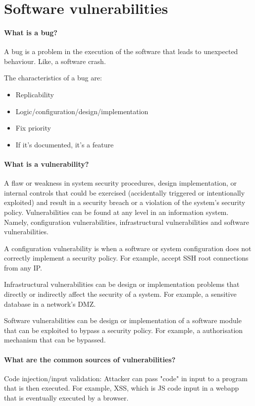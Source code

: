 \section{Software vulnerabilities}
\paragraph{What is a bug?}
A bug is a problem in the execution of the software that leads to unexpected behaviour. Like, a software crash.

The characteristics of a bug are:
\begin{itemize}
	\item Replicability
	\item Logic/configuration/design/implementation
	\item Fix priority
	\item If it's documented, it's a feature
\end{itemize}

\paragraph{What is a vulnerability?}
A flaw or weakness in system security procedures, design implementation, or internal controls that could be exercised (accidentally triggered or intentionally exploited) and result in a security breach or a violation of the system's security policy. Vulnerabilities can be found at any level in an information system. Namely, configuration vulnerabilities, infrastructural vulnerabilities and software vulnerabilities.

A configuration vulnerability is when a software or system configuration does not correctly implement a security policy. For example, accept SSH root connections from any IP.

Infrastructural vulnerabilities can be design or implementation problems that directly or indirectly affect the security of a system. For example, a sensitive database in a network's DMZ.

Software vulnerabilities can be design or implementation of a software module that can be exploited to bypass a security policy. For example, a authorisation mechanism that can be bypassed.

\paragraph{What are the common sources of vulnerabilities?}
Code injection/input validation: Attacker can pass "code" in input to a program that is then executed. For example, XSS, which is JS code input in a webapp that is eventually executed by a browser.

